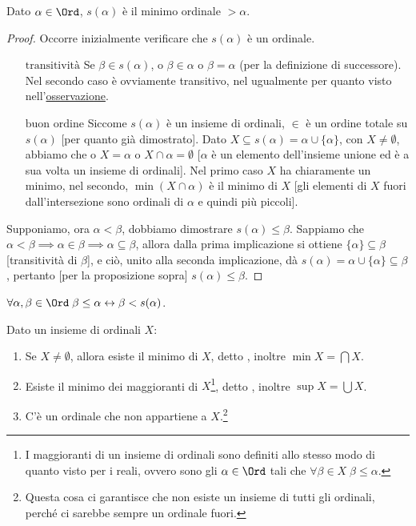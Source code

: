 \documentclass[11pt]{scrartcl}
\begin{document}
\begin{proposition}
	Dato $\alpha \in \Ord$, $s(\alpha)$ è il minimo ordinale $> \alpha$.
\end{proposition}

\begin{proof}
	Occorre inizialmente verificare che $s(\alpha)$ è un ordinale.
	\begin{itemize}
		\item[$\boxed{\text{transitività}}$] Se $\beta \in s(\alpha)$, o $\beta \in \alpha$ o $\beta = \alpha$ (per la definizione di successore). Nel secondo caso è ovviamente transitivo, nel ugualmente per quanto visto nell'\hyperref[Ord_trans]{osservazione}.
		\item[$\boxed{\text{buon ordine}}$] Siccome $s(\alpha)$ è un insieme di ordinali, $\in$ è un ordine totale su $s(\alpha)$ [per quanto già dimostrato]. Dato $X \subseteq s(\alpha) = \alpha \cup \{\alpha\}$, con $X \ne \emptyset$, abbiamo che o $X = \alpha$ o $X \cap \alpha = \emptyset$ [$\alpha$ è un elemento dell'insieme unione ed è a sua volta un insieme di ordinali].
		Nel primo caso $X$ ha chiaramente un minimo, nel secondo, $\min(X \cap \alpha)$ è il minimo di $X$ [gli elementi di $X$ fuori dall'intersezione sono ordinali di $\alpha$ e quindi più piccoli].
	\end{itemize}
	Supponiamo, ora $\alpha < \beta$, dobbiamo dimostrare $s(\alpha) \leq \beta$. Sappiamo che $\alpha < \beta \implies \alpha \in \beta \implies \alpha \subseteq \beta$, allora dalla prima implicazione si ottiene $\{\alpha\} \subseteq \beta$ [transitività di $\beta$], e ciò, unito alla seconda implicazione, dà $s(\alpha) = \alpha \cup \{\alpha\}\subseteq \beta$, pertanto [per la proposizione sopra] $s(\alpha) \leq \beta$.
\end{proof}

\begin{corollary}
	$\forall \alpha,\beta \in\Ord \; \beta \leq \alpha \leftrightarrow \beta < s(\alpha)$.
\end{corollary}

\begin{proposition}
	Dato un insieme di ordinali $X$:
	\begin{enumerate}[1.]
		\item Se $X \ne \emptyset$, allora esiste il minimo di $X$, detto , inoltre $\min X = \bigcap X$.
		\item Esiste il minimo dei maggioranti di $X$\footnote{I maggioranti di un insieme di ordinali sono definiti allo stesso modo di quanto visto per i reali, ovvero sono gli $\alpha \in \Ord$ tali che $\forall \beta \in X \; \beta \leq \alpha$.}, detto , inoltre $\sup X = \bigcup X$.
		\item C'è un ordinale che non appartiene a $X$.\footnote{Questa cosa ci garantisce che non esiste un insieme di tutti gli ordinali, perché ci sarebbe sempre un ordinale fuori.}
	\end{enumerate}
\end{proposition}
\end{document}
